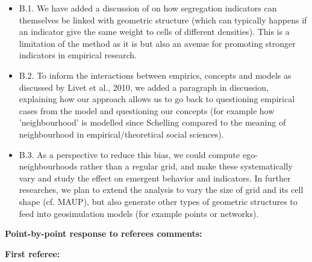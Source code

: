 \documentclass[11pt,a4paper,sans]{moderncv}        %
\begin{document}
 \begin{itemize}
 
  \item B.1. We have added a discussion of on how segregation indicators can themselves be linked with geometric structure (which can typically happens if an indicator give the same weight to cells of different densities). This is a limitation of the method as it is but also an avenue for promoting stronger indicators in empirical research.
  
  \item B.2. To inform the interactions between empirics, concepts and models as discussed by Livet et al., 2010, we added a paragraph in discussion, explaining how our approach allows us to go back to questioning empirical cases from the model and questioning our concepts (for example how 'neighbourhood' is modelled since Schelling compared to the meaning of neighbourhood in empirical/theoretical social sciences).
  
  \item B.3. As a perspective to reduce this bias, we could compute ego-neighbourhoods rather than a regular grid, and make these systematically vary and study the effect on emergent behavior and indicators. In further researches, we plan to extend the analysis to vary the size of grid and its cell shape (cf. MAUP), but also generate other types of geometric structures to feed into geosimulation models (for example points or networks).
\end{itemize}

\bigskip


\medskip
\textbf{Point-by-point response to referees comments:}

\medskip

\textbf{First referee:}

\medskip

\end{document}
